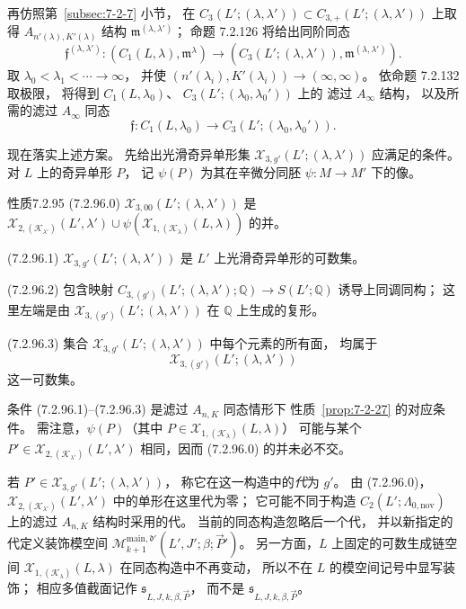 再仿照第~\ref{subsec:7-2-7} 小节，
在
$C_3(L';(\lambda,\lambda'))
\subset C_{3,+}(L';(\lambda,\lambda'))$
上取得 $A_{n'(\lambda),K'(\lambda)}$ 结构
$\mathfrak m^{(\lambda,\lambda')}$；
命题 7.2.126 将给出同阶同态
\[
\mathfrak f^{(\lambda,\lambda')}\colon
(C_1(L,\lambda),\mathfrak m^\lambda)
\longrightarrow
(C_3(L';(\lambda,\lambda')),
\mathfrak m^{(\lambda,\lambda')}).
\]
取 $\lambda_0<\lambda_1<\cdots\to\infty$，
并使
$(n'(\lambda_i),K'(\lambda_i))\to(\infty,\infty)$。
依命题 7.2.132 取极限，
将得到 $C_1(L,\lambda_0)$、
$C_3(L';(\lambda_0,\lambda_0'))$ 上的
滤过 $A_\infty$ 结构，
以及所需的滤过 $A_\infty$ 同态
\[
\mathfrak f\colon C_1(L,\lambda_0)
\longrightarrow C_3(L';(\lambda_0,\lambda_0')).
\]

现在落实上述方案。
先给出光滑奇异单形集
$\mathcal X_{3,g'}(L';(\lambda,\lambda'))$
应满足的条件。
对 $L$ 上的奇异单形 $P$，
记 $\psi(P)$ 为其在辛微分同胚
$\psi\colon M\to M'$ 下的像。

\begin{statement}{性质}{7.2.95}\label{prop:7-2-95}
\noindent\textup{(7.2.96.0)}\quad
$\mathcal X_{3,00}(L';(\lambda,\lambda'))$
是
$\mathcal X_{2,(\mathcal K_{\lambda'})}(L',\lambda')
\cup\psi(\mathcal X_{1,(\mathcal K_\lambda)}(L,\lambda))$
的并。

\noindent\textup{(7.2.96.1)}\quad
$\mathcal X_{3,g'}(L';(\lambda,\lambda'))$
是 $L'$ 上光滑奇异单形的可数集。

\noindent\textup{(7.2.96.2)}\quad
包含映射
$C_{3,(g')}(L';(\lambda,\lambda');\mathbb Q)
\to S(L';\mathbb Q)$
诱导上同调同构；
这里左端是由
$\mathcal X_{3,(g')}(L';(\lambda,\lambda'))$
在 $\mathbb Q$ 上生成的复形。

\noindent\textup{(7.2.96.3)}\quad
集合
$\mathcal X_{3,g'}(L';(\lambda,\lambda'))$
中每个元素的所有面，
均属于
\[
\mathcal X_{3,(g')}(L';(\lambda,\lambda'))
\]
这一可数集。
\end{statement}

条件 (7.2.96.1)--(7.2.96.3)
是滤过 $A_{n,K}$ 同态情形下
性质~\ref{prop:7-2-27} 的对应条件。
需注意，$\psi(P)$（其中
$P\in\mathcal X_{1,(\mathcal K_\lambda)}(L,\lambda)$）
可能与某个
$P'\in\mathcal X_{2,(\mathcal K_{\lambda'})}(L',\lambda')$
相同，因而 (7.2.96.0) 的并未必不交。

若 $P'\in\mathcal X_{3,g'}(L';(\lambda,\lambda'))$，
称它在这一构造中的\emph{代}为 $g'$。
由 (7.2.96.0)，
$\mathcal X_{2,(\mathcal K_{\lambda'})}(L',\lambda')$
中的单形在这里代为零；
它可能不同于构造 $C_2(L';\Lambda_{0,\mathrm{nov}})$
上的滤过 $A_{n,K}$ 结构时采用的代。
当前的同态构造忽略后一个代，
并以新指定的代定义装饰模空间
$\mathcal M^{\mathrm{main},\mathfrak d'}_{k+1}
(L',J';\beta;\vec P')$。
另一方面，$L$ 上固定的可数生成链空间
$\mathcal X_{1,(\mathcal K_\lambda)}(L,\lambda)$
在同态构造中不再变动，
所以不在 $L$ 的模空间记号中显写装饰；
相应多值截面记作
$\mathfrak s_{L,J,k,\beta,\vec P}$，
而不是
$\mathfrak s_{L,J,k,\beta,\vec P}$。

